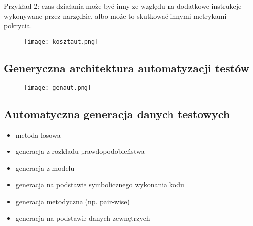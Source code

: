 \documentclass[../main.tex]{subfiles}
\begin{document}
    Przykład 2: czas działania może być inny ze względu na dodatkowe instrukcje wykonywane przez narzędzie,
    albo może to skutkować innymi metrykami pokrycia.

    \begin{figure}[H]
        \texttt{[image: kosztaut.png]}
    \end{figure}

    \subsection{ Generyczna architektura automatyzacji testów}
    \begin{figure}[H]
        \texttt{[image: genaut.png]}
    \end{figure}

    \subsection{Automatyczna generacja danych testowych}
    \begin{itemize}
        \item metoda losowa
        \item generacja z rozkładu prawdopodobieństwa
        \item generacja z modelu
        \item generacja na podstawie symbolicznego wykonania kodu
        \item generacja metodyczna (np. pair-wise)
        \item generacja na podstawie danych zewnętrzych
    \end{itemize}
\end{document}
